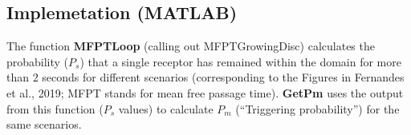 \documentclass[11pt]{article}
\begin{document}
\subsection*{Implemetation (MATLAB)}

The function \textbf{MFPTLoop} (calling out MFPTGrowingDisc) calculates the probability ($P_s$) that a single receptor has remained within the domain for more than 2 seconds for different scenarios (corresponding to the Figures in Fernandes et al., 2019; MFPT stands for mean free passage time). \textbf{GetPm} uses the output from this function ($P_s$ values) to calculate $P_m$ (``Triggering probability'') for the same scenarios.


%
\end{document}
